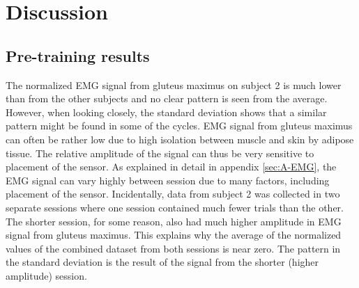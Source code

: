 \documentclass[../main.tex]{subfiles}
\begin{document}
\chapter{Discussion}
\label{sec:discussion}

\section{Pre-training results}
\label{sec:discussion_pre-training-results}

The normalized \ac{EMG} signal from gluteus maximus on subject 2 is much lower than from the other subjects and no clear pattern is seen from the average.
However, when looking closely, the standard deviation shows that a similar pattern might be found in some of the cycles.
\ac{EMG} signal from gluteus maximus can often be rather low due to high isolation between muscle and skin by adipose tissue.
The relative amplitude of the signal can thus be very sensitive to placement of the sensor.
As explained in detail in appendix \ref{sec:A-EMG}, the \ac{EMG} signal can vary highly between session due to many factors, including placement of the sensor.
Incidentally, data from subject 2 was collected in two separate sessions where one session contained much fewer trials than the other.
The shorter session, for some reason, also had much higher amplitude in \ac{EMG} signal from gluteus maximus.
This explains why the average of the normalized values of the combined dataset from both sessions is near zero.
The pattern in the standard deviation is the result of the signal from the shorter (higher amplitude) session.
\end{document}
